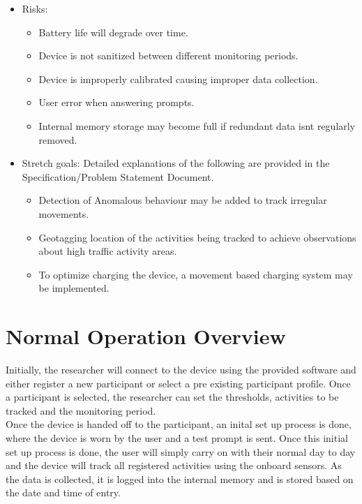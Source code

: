\documentclass[12pt]{article}
\begin{document}
\begin{itemize}
\item Risks:
	\begin{itemize}
		\item Battery life will degrade over time.
		\item Device is not sanitized between different monitoring periods.
		\item Device is improperly calibrated causing improper data collection.
		\item User error when answering prompts.
		\item Internal memory storage may become full if redundant data isnt regularly removed.
	\end{itemize}

\item Stretch goals: Detailed explanations of the following are provided in the Specification/Problem Statement Document.
	\begin{itemize}
		\item Detection of Anomalous behaviour may be added to track irregular movements.
		\item Geotagging location of the activities being tracked to achieve observations about high traffic activity areas.
		\item To optimize charging the device, a movement based charging system may be implemented.
	\end{itemize}
\end{itemize}

\section{Normal Operation Overview}
\setlength{\parindent}{20pt}
Initially, the researcher will connect to the device using the provided software and either register a new participant or select a pre existing participant profile. Once a participant is selected, the researcher can set the thresholds, activities to be tracked and the monitoring period. \\

Once the device is handed off to the participant, an inital set up process is done, where the device is worn by the user and a test prompt is sent. Once this initial set up process is done, the user will simply carry on with their normal day to day and the device will track all registered activities using the onboard sensors. As the data is collected, it is logged into the internal memory and is stored based on the date and time of entry.\\
\end{document}
